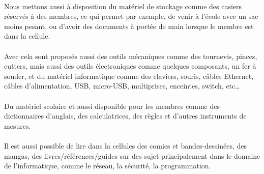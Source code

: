 \documentclass[11pt]{report}
\begin{document}
\paragraph{} Nous mettons aussi à disposition du matériel de stockage comme des
casiers réservés à des membres, ce qui permet par exemple, de venir à l'école
avec un sac moins pesant, ou d'avoir des documents à portée de main lorsque le
membre est dans la cellule.

\paragraph{} Avec cela sont proposés aussi des outils mécaniques comme des
tournevis, pinces, cutters, mais aussi des outils électroniques comme quelques
composants, un fer à souder, et du matériel informatique comme des claviers,
souris, câbles Ethernet, câbles d'alimentation, USB, micro-USB, multiprises,
enceintes, switch, etc\ldots

\paragraph{} Du matériel scolaire et aussi disponible pour les membres comme
des dictionnaires d'anglais, des calculatrices, des règles et d'autres
instruments de mesures.

\paragraph{} Il est aussi possible de lire dans la cellules des comics et
bandes-dessinées, des mangas, des livres/références/guides sur des sujet
principalement dans le domaine de l'informatique, comme le réseau, la sécurité,
la programmation.
\end{document}
